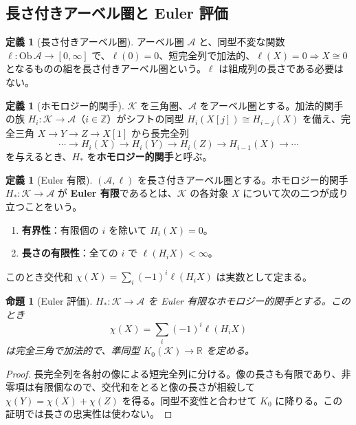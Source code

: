 \documentclass[11pt,a4paper]{ltjsarticle}
\numberwithin{equation}{section}
\theoremstyle{plain}
\newtheorem{proposition}[theorem]{命題}
\theoremstyle{definition}
\newtheorem{definition}[theorem]{定義}
\theoremstyle{definition}
\newcommand{\R}{\mathbb{R}}
\newcommand{\Z}{\mathbb{Z}}
\begin{document}
\subsection{長さ付きアーベル圏と Euler 評価}\label{sec:planB-abs}

\begin{definition}[長さ付きアーベル圏]\label{def:B-lenab}
アーベル圏 $\mathcal{A}$ と、同型不変な関数 $\ell\colon\mathrm{Ob}\,\mathcal{A}\to[0,\infty]$ で、$\ell(0)=0$、短完全列で加法的、$\ell(X)=0\Rightarrow X\cong0$ となるものの組を長さ付きアーベル圏という。$\ell$ は組成列の長さである必要はない。
\end{definition}

\begin{definition}[ホモロジー的関手]\label{def:B-homological}
$\mathcal{K}$ を三角圏、$\mathcal{A}$ をアーベル圏とする。加法的関手の族 $H_i\colon\mathcal{K}\to\mathcal{A}$（$i\in\Z$）がシフトの同型 $H_i(X[j])\cong H_{i-j}(X)$ を備え、完全三角 $X\to Y\to Z\to X[1]$ から長完全列
\[
 \cdots\to H_i(X)\to H_i(Y)\to H_i(Z)\to H_{i-1}(X)\to\cdots
\]
を与えるとき、$H_*$ を\textbf{ホモロジー的関手}と呼ぶ。
\end{definition}

\begin{definition}[Euler 有限]\label{def:B-eulerfin}
$(\mathcal{A},\ell)$ を長さ付きアーベル圏とする。ホモロジー的関手 $H_*\colon\mathcal{K}\to\mathcal{A}$ が \textbf{Euler 有限}であるとは、$\mathcal{K}$ の各対象 $X$ について次の二つが成り立つことをいう。
\begin{enumerate}[label=(\roman*)]
  \item \textbf{有界性}：有限個の $i$ を除いて $H_i(X)=0$。
  \item \textbf{長さの有限性}：全ての $i$ で $\ell(H_iX)<\infty$。
\end{enumerate}
このとき交代和 $\chi(X)=\sum_i(-1)^i\ell(H_iX)$ は実数として定まる。
\end{definition}

\begin{proposition}[Euler 評価]\label{prop:B-euler}
$H_*\colon\mathcal{K}\to\mathcal{A}$ を Euler 有限なホモロジー的関手とする。このとき
\[
 \chi(X)=\sum_i(-1)^i\ell(H_iX)
\]
は完全三角で加法的で、準同型 $K_0(\mathcal{K})\to\R$ を定める。
\end{proposition}
\begin{proof}
長完全列を各射の像による短完全列に分ける。像の長さも有限であり、非零項は有限個なので、交代和をとると像の長さが相殺して $\chi(Y)=\chi(X)+\chi(Z)$ を得る。同型不変性と合わせて $K_0$ に降りる。この証明では長さの忠実性は使わない。
\end{proof}
\end{document}

